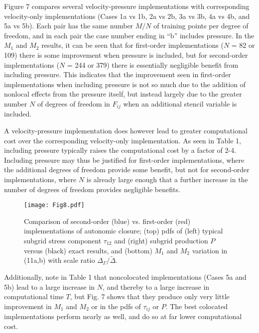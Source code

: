 Figure 7 compares several velocity-pressure implementations with corresponding velocity-only implementations (Cases 1a vs 1b, 2a vs 2b, 3a vs 3b, 4a vs 4b, and 5a vs 5b). Each pair has the same number $M/N$  of training points per degree of freedom, and in each pair the case number ending in “b” includes pressure. In the $M_1$  and $M_2$  results, it can be seen that for first-order implementations ($N$ = 82 or 109) there is some improvement when pressure is included, but for second-order implementations ($N$ = 244 or 379) there is essentially negligible benefit from including pressure. This indicates that the improvement seen in first-order implementations when including pressure is not so much due to the addition of nonlocal effects from the pressure itself, but instead largely due to the greater number $N$ of degrees of freedom in $F_{ij}$  when an additional stencil variable is included. 

A velocity-pressure implementation does however lead to greater computational cost over the corresponding velocity-only implementation. As seen in Table 1, including pressure typically raises the computational cost by a factor of 2-4. Including pressure may thus be justified for first-order implementations, where the additional degrees of freedom provide some benefit, but not for second-order implementations, where $N$ is already large enough that a further increase in the number of degrees of freedom provides negligible benefits.

%
\begin{figure}
	\begin{center}
	\texttt{[image: Fig8.pdf]}
	\caption{ Comparison of second-order (blue) vs. first-order (red) implementations of autonomic closure; (top) pdfs of (left) typical subgrid stress component $\tau_{12}$ and (right) subgrid production $P$ versus (black) exact results, and (bottom) $M_1$ and $M_2$ variation in (11a,b) with scale ratio $\Delta_{\Gamma}/\widetilde{\Delta}$.}
	\label{F:8}
	\end{center}
\end{figure}
%

Additionally, note in Table 1 that noncolocated implementations (Cases 5a and 5b) lead to a large increase in $N$, and thereby to a large increase in computational time $T$, but Fig. 7 shows that they produce only very little improvement in  $M_1$ and $M_2$  or in the pdfs of  $\tau_{ij}$ or $P$. The best colocated implementations perform nearly as well, and do so at far lower computational cost.

